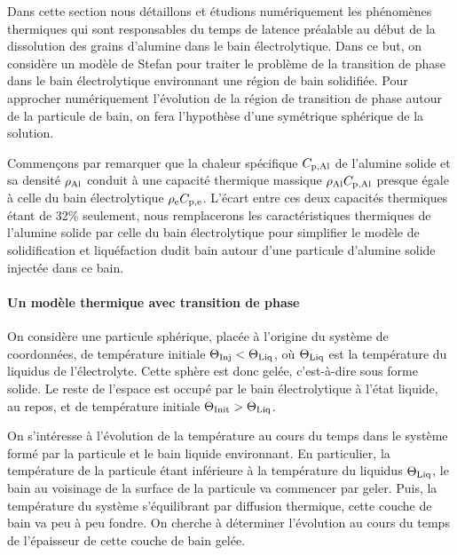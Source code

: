 Dans cette section nous détaillons et étudions numériquement les
phénomènes thermiques qui sont responsables du temps de latence
préalable au début de la dissolution des grains d'alumine dans le bain
électrolytique. Dans ce but, on considère un modèle de Stefan pour
traiter le problème de la transition de phase dans le bain
électrolytique environnant une région de bain solidifiée. Pour
approcher numériquement l'évolution de la région de transition de
phase autour de la particule de bain, on fera l'hypothèse d'une
symétrique sphérique de la solution.

Commençons par remarquer que la chaleur spécifique $C_{\mathrm{p,Al}}$ de
l'alumine solide et sa densité $\rho_\mathrm{Al}$ conduit à une
capacité thermique massique $\rho_\mathrm{Al}C_{\mathrm{p,Al}}$ presque égale
à celle du bain électrolytique
$\rho_\mathrm{e}C_{\mathrm{p,e}}$. L'écart entre ces deux capacités
thermiques étant de \num{32}\% seulement, nous remplacerons les
caractéristiques thermiques de l'alumine solide par celle du bain
électrolytique pour simplifier le modèle de solidification et
liquéfaction dudit bain autour d'une particule d'alumine solide
injectée dans ce bain.


\paragraph{Un modèle thermique avec transition de phase}
On considère une particule sphérique, placée à l'origine du système de
coordonnées, de température initiale $\Theta_\text{Inj}<\Theta_\text{Liq}$, où $\Theta_\text{Liq}$ est la
température du liquidus de l'électrolyte. Cette sphère est donc gelée,
c'est-à-dire sous forme solide. Le reste de l'espace est occupé par le
bain électrolytique à l'état liquide, au repos, et de température
initiale $\Theta_\text{Init} > \Theta_\text{Liq}$.

On s'intéresse à l'évolution de la température au cours du temps dans
le système formé par la particule et le bain liquide environnant. En
particulier, la température de la particule étant inférieure à la
température du liquidus $\Theta_\text{Liq}$, le bain au voisinage de la surface de
la particule va commencer par geler. Puis, la température du système
s'équilibrant par diffusion thermique, cette couche de bain va peu à
peu fondre. On cherche à déterminer l'évolution au cours du temps de
l'épaisseur de cette couche de bain gelée.

